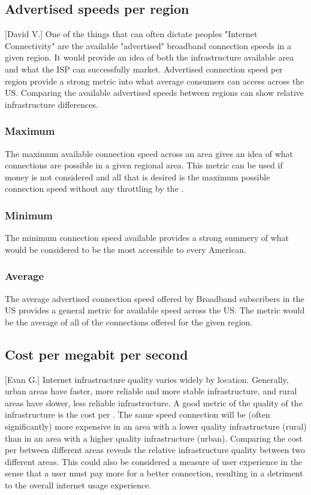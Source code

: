 \subsection{Advertised speeds per region}[David V.]
One of the things that can often dictate peoples "Internet Connectivity" are the available "advertised" broadband connection speeds in a given region. It would provide an idea of both the infrastructure available area and what the ISP can successfully market. Advertised connection speed per region provide a strong metric into what average consumers can access across the US. Comparing the available advertised speeds between regions can show relative infrastructure differences.

\subsubsection{Maximum}
The maximum available connection speed across an area gives an idea of what connections are possible in a given regional area. This metric can be used if money is not considered and all that is desired is the maximum possible connection speed without any throttling by the \isp.
\subsubsection{Minimum}
The minimum connection speed available provides a strong summery of what would be considered to be the most accessible to every American.
\subsubsection{Average}
The average advertised connection speed offered by Broadband subscribers in the US provides a general metric for available speed across the US. The metric would be the average of all of the connections offered for the given region. 

\subsection{Cost per megabit per second}[Evan G.]
Internet infrastructure quality varies widely by location. Generally, urban areas have faster, more reliable and more stable infrastructure, and rural areas have slower, less reliable infrastructure. A good metric of the quality of the infrastructure is the cost per \mbps. The same speed connection will be (often significantly) more expensive in an area with a lower quality infrastructure (rural) than in an area with a higher quality infrastructure (urban). Comparing the cost per \mbps between different areas reveals the relative infrastructure quality between two different areas. This could also be considered a measure of user experience in the sense that a user must pay more for a better connection, resulting in a detriment to the overall internet usage experience.

